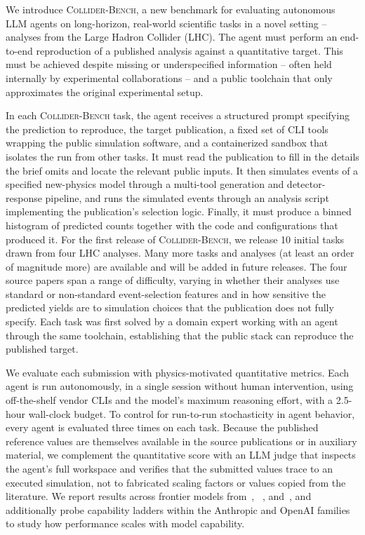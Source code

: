\documentclass{article}
\newcommand{\ColliderBench}{\textsc{Collider-Bench}}
\begin{document}
We introduce \ColliderBench{}, a new benchmark for evaluating  autonomous LLM agents on long-horizon, real-world scientific tasks in a novel setting -- analyses from the Large Hadron Collider (LHC). The agent must perform an end-to-end reproduction of a published analysis against a quantitative target. This must be achieved despite missing or underspecified information -- often held internally by experimental collaborations -- and a public toolchain that only approximates the original experimental setup.
 
In each \ColliderBench{} task, the agent receives a structured prompt specifying the prediction to reproduce, the target publication, a fixed set of CLI tools wrapping the public simulation software, and a containerized sandbox that isolates the run from other tasks. It must read the publication to fill in the details the brief omits and locate the relevant public inputs. It then simulates events of a specified new-physics model through a multi-tool generation and detector-response pipeline, and runs the simulated events through an analysis script implementing the publication's selection logic. Finally, it must produce a binned histogram of predicted counts together with the code and configurations that produced it. For the first release of \ColliderBench{}, we release 10 initial tasks drawn from four LHC analyses. Many more tasks and analyses (at least an order of magnitude more) are available and will be added in future releases. The four source papers span a range of difficulty, varying in whether their analyses use standard or non-standard event-selection features and in how sensitive the predicted yields are to simulation choices that the publication does not fully specify. Each task was first solved by a domain expert working with an agent through the same toolchain, establishing that the public stack can reproduce the published target.

We evaluate each submission with physics-motivated quantitative metrics. Each agent is run autonomously, in a single session without human intervention, using off-the-shelf vendor CLIs and the model's maximum reasoning effort, with a 2.5-hour wall-clock budget. To control for run-to-run stochasticity in agent behavior, every agent is evaluated three times on each task. Because the published reference values are themselves available in the source publications or in auxiliary material, we complement the quantitative score with an LLM judge  \cite{zheng2023judging}  that inspects the agent's full workspace and verifies that the submitted values trace to an executed simulation, not to fabricated scaling factors or values copied from the literature. We report results across frontier models from~\citep{anthropic2026claudemodels}, ~\citep{ openai2026gpt54thinking,openai2026gpt55}, and~\citep{deepseek2026v4}, and additionally probe capability ladders within the Anthropic and OpenAI families to study how performance scales with model capability.
\end{document}
